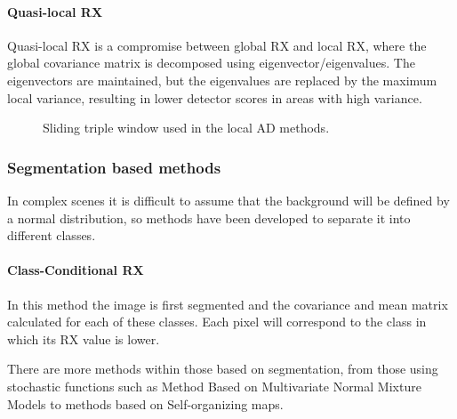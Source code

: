 \paragraph{Quasi-local RX}
Quasi-local RX is a compromise between global RX and local RX, where the global covariance matrix is decomposed using eigenvector/eigenvalues. The eigenvectors are maintained, but the eigenvalues are replaced by the maximum local variance, resulting in lower detector scores in areas with high variance.

\begin{figure}[h!]
\centering
\hspace*{100pt}%
\caption{Sliding triple window used in the local AD methods.}
  \label{fig:ventana}
\end{figure}

\subsubsection{Segmentation based methods}
In complex scenes it is difficult to assume that the background will be defined by a normal distribution, so methods have been developed to separate it into different classes.

\paragraph{Class-Conditional RX}
In this method the image is first segmented and the covariance and mean matrix calculated for each of these classes. Each pixel will correspond to the class in which its RX value is lower.

There are more methods within those based on segmentation, from those using stochastic functions such as Method Based on Multivariate Normal Mixture Models to methods based on Self-organizing maps.



